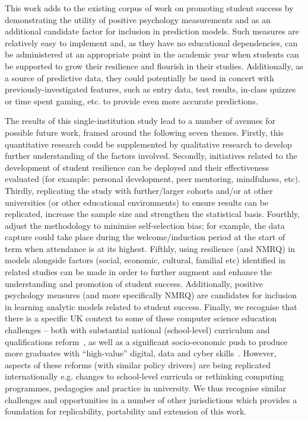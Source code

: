 \documentclass[sigconf]{acmart}
\begin{document}
This work adds to the existing corpus of work on promoting student success by demonstrating the utility of positive psychology measurements and as an additional candidate factor for inclusion in prediction models. Such measures are relatively easy to implement and, as they have no educational dependencies, can be administered at an appropriate point in the academic year when students can be supported to grow their resilience and flourish in their studies. Additionally, as a source of predictive data, they could potentially be used in concert with previously-investigated features, such as entry data, test results,  in-class quizzes or time spent gaming, etc. to provide even more accurate predictions. 

The results of this single-institution study lead to a number of avenues for possible future work, framed around the following seven themes. Firstly, this quantitative research could be supplemented by qualitative research to develop further understanding of the factors involved. Secondly, initiatives related to the development of student resilience can be deployed and their effectiveness evaluated (for example: personal development, peer mentoring, mindfulness, etc). Thirdly, replicating the study with further/larger cohorts and/or at other universities (or other educational environments) to ensure results can be replicated, increase the sample size and strengthen the statistical basis. Fourthly, adjust the methodology to minimise self-selection bias; for example, the data capture could take place during the welcome/induction period at the start of term when attendance is at its highest. Fifthly, using resilience (and NMRQ) in models alongside factors (social, economic, cultural, familial etc) identified in related studies can be made in order to further augment and enhance the understanding and promotion of student success. Additionally, positive psychology measures (and more specifically NMRQ) are candidates for inclusion in learning analytic models related to student success. Finally, we recognise that there is a specific UK context to some of these computer science education challenges -- both with substantial national (school-level) curriculum and qualifications reform~\cite{brown-et-al-toce2014}, as well as a significant socio-economic push to produce more graduates with ``high-value'' digital, data and cyber skills~\cite{crick-et-al:fie2019,crick-et-al-accred:cep2020}. However, aspects of these reforms (with similar policy drivers) are being replicated internationally e.g. changes to school-level curricula or rethinking computing programmes, pedagogies and practice in university. We thus recognise similar challenges and opportunities in a number of other jurisdictions which provides a foundation for replicability, portability and extension of this work.
\end{document}
